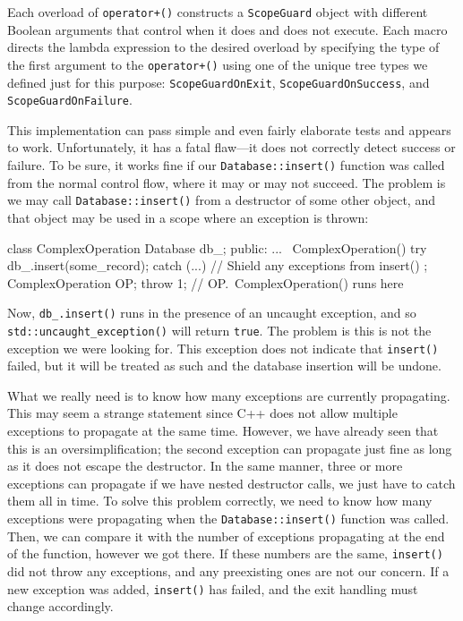 Each overload of \texttt{operator+()} constructs a \texttt{ScopeGuard} object with different Boolean arguments that control when it does and does not execute. Each macro directs the lambda expression to the desired overload by specifying the type of the first argument to the \texttt{operator+()} using one of the unique tree types we defined just for this purpose: \texttt{ScopeGuardOnExit}, \texttt{ScopeGuardOnSuccess}, and \texttt{ScopeGuardOnFailure}.

This implementation can pass simple and even fairly elaborate tests and appears to work. Unfortunately, it has a fatal flaw---it does not correctly detect success or failure. To be sure, it works fine if our \texttt{Database::insert()} function was called from the normal control flow, where it may or may not succeed. The problem is we may call \texttt{Database::insert()} from a destructor of some other object, and that object may be used in a scope where an exception is thrown:

\begin{code}
class ComplexOperation {
  Database db_;
  public:
  ...
  ~ComplexOperation() {
    try {
      db_.insert(some_record);
    } catch (...) {}    // Shield any exceptions from insert()
  }
};
{
  ComplexOperation OP;
  throw 1;
}    // OP.~ComplexOperation() runs here
\end{code}

Now, \texttt{db\_.insert()} runs in the presence of an uncaught exception, and so \texttt{std::uncaught\_exception()} will return \texttt{true}. The problem is this is not the exception we were looking for. This exception does not indicate that \texttt{insert()} failed, but it will be treated as such and the database insertion will be undone.

What we really need is to know how many exceptions are currently propagating. This may seem a strange statement since C++ does not allow multiple exceptions to propagate at the same time. However, we have already seen that this is an oversimplification; the second exception can propagate just fine as long as it does not escape the destructor. In the same manner, three or more exceptions can propagate if we have nested destructor calls, we just have to catch them all in time. To solve this problem correctly, we need to know how many exceptions were propagating when the \texttt{Database::insert()} function was called. Then, we can compare it with the number of exceptions propagating at the end of the function, however we got there. If these numbers are the same, \texttt{insert()} did not throw any exceptions, and any preexisting ones are not our concern. If a new exception was added, \texttt{insert()} has failed, and the exit handling must change accordingly.

